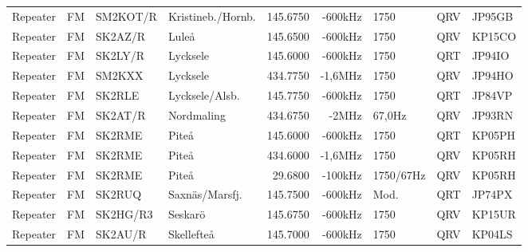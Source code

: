 \begin{landscape}
\begin{longtable}{llllrrlcl}
Repeater                          & FM            & SM2KOT/R      & Kristineb./Hornb.   & 145.6750          & -600kHz        & 1750             & QRV             & JP95GB           \\
Repeater                          & FM            & SK2AZ/R       & Luleå               & 145.6500          & -600kHz        & 1750             & QRV             & KP15CO           \\
Repeater                          & FM            & SK2LY/R       & Lycksele            & 145.6000          & -600kHz        & 1750             & QRT             & JP94IO           \\
Repeater                          & FM            & SM2KXX        & Lycksele            & 434.7750          & -1,6MHz        & 1750             & QRV             & JP94HO           \\
Repeater                          & FM            & SK2RLE        & Lycksele/Alsb.      & 145.7750          & -600kHz        & 1750             & QRT             & JP84VP           \\
Repeater                          & FM            & SK2AT/R       & Nordmaling          & 434.6750          & -2MHz          & 67,0Hz           & QRV             & JP93RN           \\
Repeater                          & FM            & SK2RME        & Piteå               & 145.6000          & -600kHz        & 1750             & QRT             & KP05PH           \\
Repeater                          & FM            & SK2RME        & Piteå               & 434.6000          & -1,6MHz        & 1750             & QRV             & KP05RH           \\
Repeater                          & FM            & SK2RME        & Piteå               & 29.6800           & -100kHz        & 1750/67Hz        & QRV             & KP05RH           \\
Repeater                          & FM            & SK2RUQ        & Saxnäs/Marsfj.      & 145.7500          & -600kHz        & Mod.             & QRT             & JP74PX           \\
Repeater                          & FM            & SK2HG/R3      & Seskarö             & 145.6750          & -600kHz        & 1750             & QRV             & KP15UR           \\
Repeater                          & FM            & SK2AU/R       & Skellefteå          & 145.7000          & -600kHz        & 1750             & QRV             & KP04LS           \\

\end{longtable}
\end{landscape}
